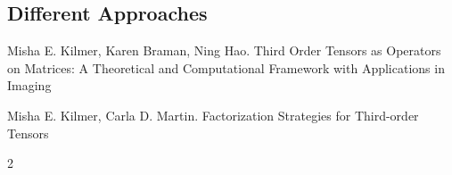 \documentclass[twoside]{article}
\begin{document}
\begin{multicols}{2}
\section{Different Approaches}





\begin{thebibliography}{99}

Misha E. Kilmer, Karen Braman, Ning Hao.
\newblock Third Order Tensors as Operators on Matrices: A
Theoretical and Computational Framework with
Applications in Imaging

Misha E. Kilmer, Carla D. Martin.
\newblock Factorization Strategies for Third-order Tensors

 
\end{thebibliography}


\end{multicols}{2}
\end{document}
